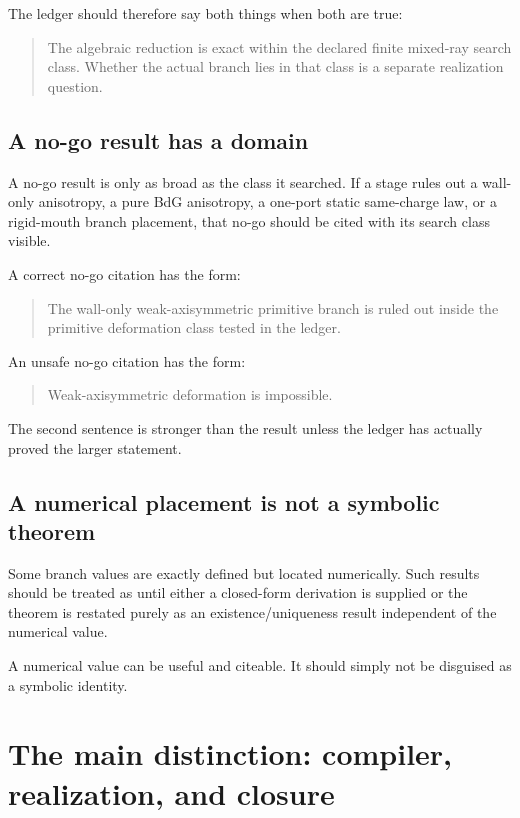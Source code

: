 The ledger should therefore say both things when both are true:
\begin{quote}
The algebraic reduction is exact within the declared finite mixed-ray search class.  Whether the actual branch lies in that class is a separate realization question.
\end{quote}

\subsection{A no-go result has a domain}
\label{subsec:nogo-domain}

A no-go result is only as broad as the class it searched.  If a stage rules out a wall-only anisotropy, a pure BdG anisotropy, a one-port static same-charge law, or a rigid-mouth branch placement, that no-go should be cited with its search class visible.

A correct no-go citation has the form:
\begin{quote}
The wall-only weak-axisymmetric primitive branch is ruled out inside the primitive deformation class tested in the ledger.
\end{quote}

An unsafe no-go citation has the form:
\begin{quote}
Weak-axisymmetric deformation is impossible.
\end{quote}

The second sentence is stronger than the result unless the ledger has actually proved the larger statement.

\subsection{A numerical placement is not a symbolic theorem}
\label{subsec:numerical-placement}

Some branch values are exactly defined but located numerically.  Such results should be treated as \StatusNumerical until either a closed-form derivation is supplied or the theorem is restated purely as an existence/uniqueness result independent of the numerical value.

A numerical value can be useful and citeable.  It should simply not be disguised as a symbolic identity.

\section{The main distinction: compiler, realization, and closure}
\label{sec:compiler-realization-closure}

